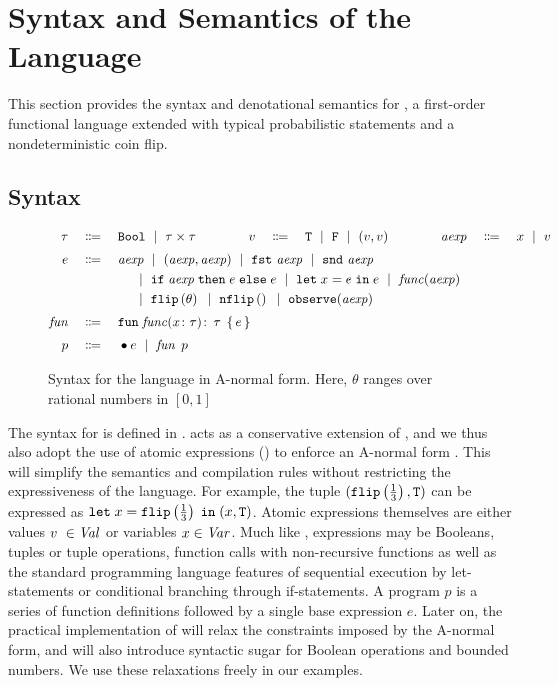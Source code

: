 
\section{Syntax and Semantics of the \protect\NDICE Language}\label{sec:semantics}

This section provides the syntax and denotational semantics for \NDICE, a first-order functional language extended with typical probabilistic statements and a nondeterministic coin flip. 

\subsection{Syntax}

\begin{figure}
	\begin{align*}
		\tau 
		\quad{}\Coloneqq{}\quad &
		\texttt{Bool} 
		~\;{}|{}~\; 
		\tau \times \tau 
		\qquad\qquad
		v 
		\quad{}\Coloneqq{}\quad 
		\texttt{T}  
		~\;{}|{}~\; 
		\texttt{F}  
		~\;{}|{}~\; 
		(v, v)
		\qquad\qquad
		\mathit{aexp} 
		\quad{}\Coloneqq{}\quad 
		x  
		~\;{}|{}~\; 
		v
		\\[.25em]
		e 
		\quad{}\Coloneqq{}\quad&
		\mathit{aexp}  
		~\;{}|{}~\; 
		(\mathit{aexp}, \mathit{aexp}) 
		~\;{}|{}~\; 
		\texttt{fst}\, \,\mathit{aexp}  
		~\;{}|{}~\; 
		\texttt{snd}\, \,\mathit{aexp}  
		\\
		&\quad{}~\;{}|{}~\;
		\textnormal{\texttt{if}}\;{\mathit{aexp}}\;\texttt{then}\; e \; \textnormal{\texttt{else}}\; e  
		~\;{}|{}~\; 
		\texttt{let}\; x = e \;\texttt{in}\; e 
		~\;{}|{}~\; 
		\mathit{func}(\mathit{aexp})
		\\
		&\quad{}~\;{}|{}~\;
		\texttt{flip} \left(\theta\right)  
		~\;{}|{}~\; 
		\texttt{nflip}\left(\right)  
		~\;{}|{}~\; 
		\textnormal{\texttt{observe}} (\mathit{aexp}) 
		\\[.25em]
		\mathit{fun} 
		\quad{}\Coloneqq{}\quad &
		\texttt{fun} \; \mathit{func}(x\colon \tau)\colon \, \tau \; \left\{\, e \,\right\} \\[.25em]
		p 
		\quad{}\Coloneqq{}\quad &
		\bullet e ~\;{}|{}~\; \mathit{fun}\;\, p
	\end{align*}%
	\caption{Syntax for the \NDICE language in A-normal form. Here, $\theta$ ranges over rational numbers in $[0,1]$}%
	\label{fig:syntax}%
\end{figure}%
%
%
The syntax for \NDICE is defined in .
\NDICE acts as a conservative extension of \DICE, and we thus also adopt the use of atomic expressions (\AEXP) to enforce an A-normal form \cite{flanagan1993essence}.
This will simplify the semantics and compilation rules without restricting the expressiveness of the language. 
For example, the tuple $(\texttt{flip} \left(\frac{1}{3}\right) , \texttt{T})$ can be expressed as $\texttt{let}\; x = \texttt{flip} \left(\frac{1}{3}\right)  \;\texttt{in}\; (x, \texttt{T})$.
Atomic expressions themselves are either values $v \in \VAL$ or variables $x \in \mathit{Var}$.
Much like \DICE, \NDICE expressions may be Booleans, tuples or tuple operations, function calls with non-recursive functions as well as the standard programming language features of sequential execution by let-statements or conditional branching through if-statements.
A \NDICE program $p$ is a series of function definitions 
followed by a single base expression $e$.
Later on, the practical implementation of \NDICE will relax the constraints imposed by the A-normal form, and will also introduce syntactic sugar for Boolean operations and bounded numbers.
We use these relaxations freely in our examples.

